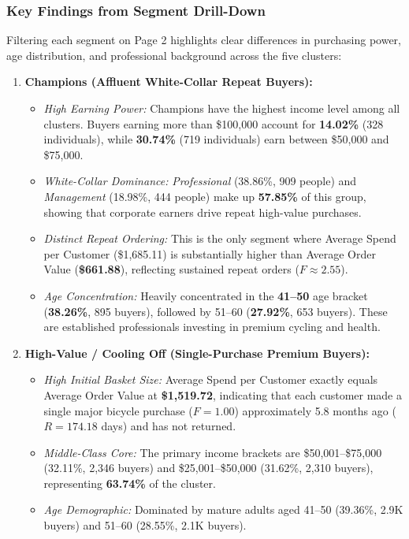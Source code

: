 \subsubsection{Key Findings from Segment Drill-Down}
Filtering each segment on Page 2 highlights clear differences in purchasing power, age distribution, and professional background across the five clusters:
\begin{enumerate}
    \item \textbf{Champions (Affluent White-Collar Repeat Buyers):}
    \begin{itemize}
        \item \textit{High Earning Power:} Champions have the highest income level among all clusters. Buyers earning more than \$100,000 account for \textbf{14.02\%} (328 individuals), while \textbf{30.74\%} (719 individuals) earn between \$50,000 and \$75,000.
        \item \textit{White-Collar Dominance:} \textit{Professional} (38.86\%, 909 people) and \textit{Management} (18.98\%, 444 people) make up \textbf{57.85\%} of this group, showing that corporate earners drive repeat high-value purchases.
        \item \textit{Distinct Repeat Ordering:} This is the only segment where Average Spend per Customer (\$1,685.11) is substantially higher than Average Order Value (\textbf{\$661.88}), reflecting sustained repeat orders ($F \approx 2.55$).
        \item \textit{Age Concentration:} Heavily concentrated in the \textbf{41--50} age bracket (\textbf{38.26\%}, 895 buyers), followed by 51--60 (\textbf{27.92\%}, 653 buyers). These are established professionals investing in premium cycling and health.
    \end{itemize}

    \item \textbf{High-Value / Cooling Off (Single-Purchase Premium Buyers):}
    \begin{itemize}
        \item \textit{High Initial Basket Size:} Average Spend per Customer exactly equals Average Order Value at \textbf{\$1,519.72}, indicating that each customer made a single major bicycle purchase ($F=1.00$) approximately 5.8 months ago ($R=174.18$ days) and has not returned.
        \item \textit{Middle-Class Core:} The primary income brackets are \$50,001--\$75,000 (32.11\%, 2,346 buyers) and \$25,001--\$50,000 (31.62\%, 2,310 buyers), representing \textbf{63.74\%} of the cluster.
        \item \textit{Age Demographic:} Dominated by mature adults aged 41--50 (39.36\%, 2.9K buyers) and 51--60 (28.55\%, 2.1K buyers).
    \end{itemize}


\end{enumerate}
